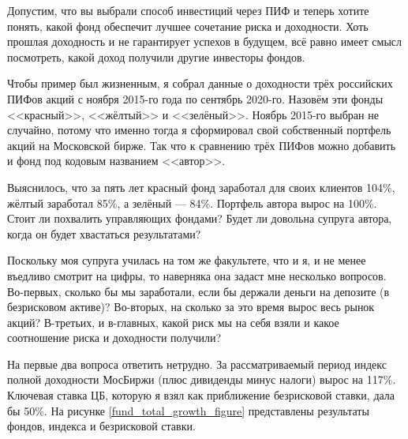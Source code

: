 Допустим, что вы выбрали способ инвестиций через ПИФ и теперь хотите понять, 
какой фонд обеспечит лучшее сочетание риска и доходности. Хоть прошлая 
доходность и не гарантирует успехов в будущем, всё равно имеет смысл посмотреть, 
какой доход получили другие инвесторы фондов.

Чтобы пример был жизненным, я собрал данные о доходности трёх российских ПИФов 
акций с ноября 2015-го года по сентябрь 2020-го. Назовём эти фонды <<красный>>, 
<<жёлтый>> и <<зелёный>>. Ноябрь 2015-го выбран не случайно, потому что именно 
тогда я сформировал свой собственный портфель акций на Московской бирже. Так что 
к сравнению трёх ПИФов можно добавить и фонд под кодовым названием <<автор>>.

Выяснилось, что за пять лет красный фонд заработал для своих клиентов 104\%, 
жёлтый заработал 85\%, а зелёный --- 84\%. Портфель автора вырос на 100\%. Стоит 
ли похвалить управляющих фондами? Будет ли довольна супруга автора, когда он 
будет хвастаться результатами?

Поскольку моя супруга училась на том же факультете, что и я, и не менее въедливо 
смотрит на цифры, то наверняка она задаст мне несколько вопросов. Во-первых, 
сколько бы мы заработали, если бы держали деньги на депозите (в безрисковом 
активе)? Во-вторых, на сколько за это время вырос весь рынок акций? В-третьих, и 
в-главных, какой риск мы на себя взяли и какое соотношение риска и доходности 
получили?

На первые два вопроса ответить нетрудно. За рассматриваемый период индекс  
полной доходности МосБиржи (плюс дивиденды минус налоги) вырос на 117\%. 
Ключевая ставка ЦБ, которую я взял как приближение безрисковой ставки, дала бы 
50\%. На рисунке \ref{fund_total_growth_figure} представлены результаты фондов, 
индекса и безрисковой ставки.

